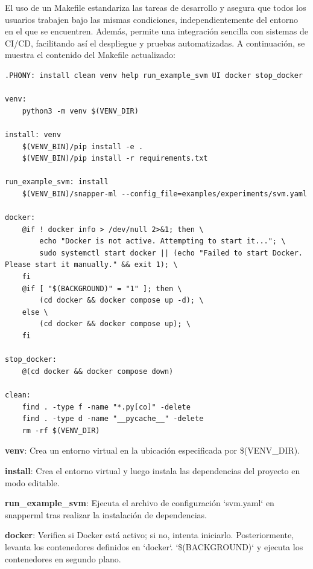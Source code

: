 El uso de un Makefile estandariza las tareas de desarrollo y asegura que todos los usuarios trabajen bajo las mismas condiciones, independientemente del entorno en el que se encuentren. Además, permite una integración sencilla con sistemas de CI/CD, facilitando así el despliegue y pruebas automatizadas. A continuación, se muestra el contenido del Makefile actualizado:

\begin{verbatim}
.PHONY: install clean venv help run_example_svm UI docker stop_docker

venv:
	python3 -m venv $(VENV_DIR)

install: venv
	$(VENV_BIN)/pip install -e .
	$(VENV_BIN)/pip install -r requirements.txt

run_example_svm: install
    $(VENV_BIN)/snapper-ml --config_file=examples/experiments/svm.yaml

docker:
    @if ! docker info > /dev/null 2>&1; then \
        echo "Docker is not active. Attempting to start it..."; \
        sudo systemctl start docker || (echo "Failed to start Docker. Please start it manually." && exit 1); \
    fi
    @if [ "$(BACKGROUND)" = "1" ]; then \
        (cd docker && docker compose up -d); \
    else \
        (cd docker && docker compose up); \
    fi

stop_docker:
    @(cd docker && docker compose down)

clean:
	find . -type f -name "*.py[co]" -delete
	find . -type d -name "__pycache__" -delete
	rm -rf $(VENV_DIR)
\end{verbatim}
\textbf{venv}: Crea un entorno virtual en la ubicación especificada por \$(VENV\_DIR).

\vspace{4mm}

\textbf{install}: Crea el entorno virtual y luego instala las dependencias del proyecto en modo editable.

\vspace{2.5mm}

\textbf{run\_example\_svm}: Ejecuta el archivo de configuración `svm.\acrshort{yaml}` en \Gls{snapperml} tras realizar la instalación de dependencias.

\vspace{2.5mm}

\textbf{docker}: Verifica si Docker está activo; si no, intenta iniciarlo. Posteriormente, levanta los contenedores definidos en `docker`. `\$(BACKGROUND)` y ejecuta los contenedores en segundo plano.

